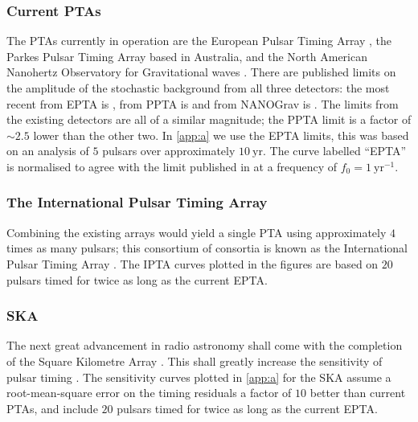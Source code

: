 \subsubsection{Current PTAs}

The PTAs currently in operation are the European Pulsar Timing Array \citep[EPTA\footnote{\url{http://www.epta.eu.org/}};][]{eptareview2013}, the Parkes Pulsar Timing Array \citep[PPTA\footnote{\url{http://www.atnf.csiro.au/research/pulsar/ppta/}};][]{parkesreview2013} based in Australia, and the North American Nanohertz Observatory for Gravitational waves \citep[NANOGrav\footnote{\url{http://nanograv.org/}};][]{nanogravreview2013}. There are published limits on the amplitude of the stochastic background from all three detectors: the most recent from EPTA is \citet{Haasteren}, from PPTA is \citet{Shannon2013} and from NANOGrav is \citet{2013ApJ...762...94D}. The limits from the existing detectors are all of a similar magnitude; the PPTA limit is a factor of $\sim 2.5$ lower than the other two. In \ref{app:a} we use the EPTA limits, this was based on an analysis of $5$ pulsars over approximately $10~\mathrm{yr}$. The curve labelled ``EPTA'' is normalised to agree with the limit published in \cite{Haasteren} at a frequency of $f_{0}=1~\mathrm{yr^{-1}}$.

\subsubsection{The International Pulsar Timing Array}

Combining the existing arrays would yield a single PTA using approximately $4$ times as many pulsars; this consortium of consortia is known as the International Pulsar Timing Array \citep[IPTA\footnote{\url{http://www.ipta4gw.org/}};][]{iptareview2013}. The IPTA curves plotted in the figures are based on $20$ pulsars timed for twice as long as the current EPTA.

\subsubsection{SKA}

The next great advancement in radio astronomy shall come with the completion of the Square Kilometre Array \citep[SKA;][]{Dewdney2009}. This shall greatly increase the sensitivity of pulsar timing \citep{Kramer2004}. The sensitivity curves plotted in \ref{app:a} for the SKA assume a root-mean-square error on the timing residuals a factor of $10$ better than current PTAs, and include $20$ pulsars timed for twice as long as the current EPTA.

